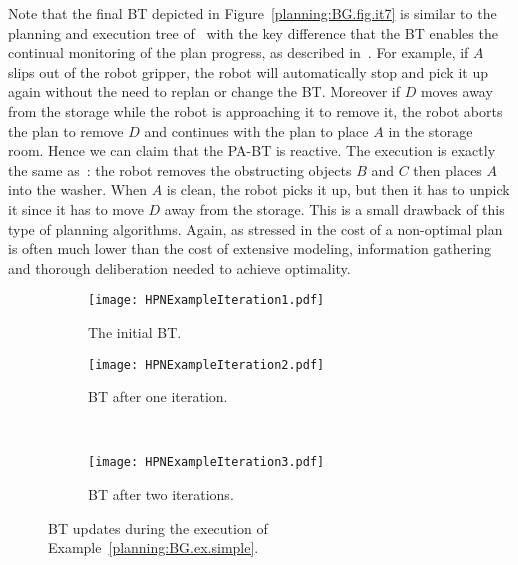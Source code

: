 Note that the final BT depicted in Figure~\ref{planning:BG.fig.it7} is similar to the planning and execution tree of~\cite{kaelbling2011hierarchical} with the key difference that the BT enables the continual monitoring of the plan progress, as described in~\cite{Nau15Challenges}. For example, if  $A$ slips out of the robot gripper, the robot will automatically stop and pick it up again without the need to replan or change the BT. Moreover if $D$ moves away from the storage while the robot is approaching it to remove it, the robot aborts the plan to remove $D$ and continues with the plan to place $A$ in the storage room. Hence we can claim that the PA-BT is  reactive. The execution is exactly the same as~\cite{kaelbling2011hierarchical}: the robot removes the obstructing objects $B$ and $C$ then places $A$ into the washer. When $A$ is clean, the robot picks it up, but then it has to unpick it since it has to move  $D$ away from the storage. This is a small drawback of this type of planning algorithms. Again, as stressed in \cite{ghallab2016automated} the cost of a non-optimal plan is often much lower than the cost of extensive modeling, information gathering and thorough deliberation needed to achieve optimality.




\begin{figure}[h!]
        \centering
          \begin{subfigure}[t]{0.3\columnwidth}
                \centering
\texttt{[image: HPNExampleIteration1.pdf]}
                \caption{The initial BT.}
                \label{planning:BG.fig.it0}
        \end{subfigure}%


        \begin{subfigure}[t]{0.4\columnwidth}
\texttt{[image: HPNExampleIteration2.pdf]}
                \caption{BT after one iteration.}
                \label{planning:BG.fig.it1}
        \end{subfigure}%
        
       ~ %
        \begin{subfigure}[t]{0.45\columnwidth}
                \centering
\texttt{[image: HPNExampleIteration3.pdf]}
                \caption{BT after two iterations.}
                \label{planning:BG.fig.it2}              
        \end{subfigure}
                \caption{BT updates during the execution of Example~\ref{planning:BG.ex.simple}.}
\end{figure}



